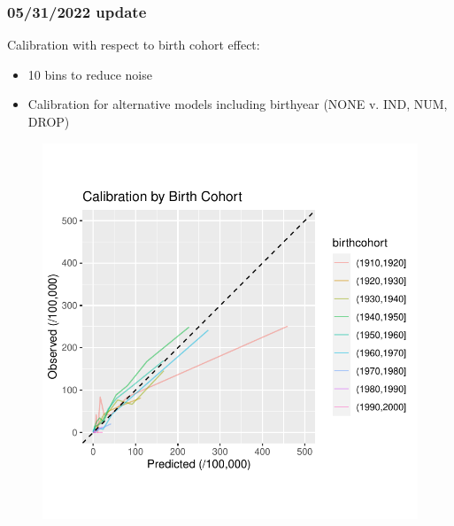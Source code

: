\documentclass[12pt]{article}
\begin{document}
\clearpage
\pagebreak
\subsubsection*{05/31/2022 update}

Calibration with respect to birth cohort effect:
\begin{itemize}
	\item 10 bins to reduce noise
	\item Calibration for alternative models including birthyear (NONE v. IND, NUM, DROP)
\end{itemize}



\begin{figure}[h]
\centering
\includegraphics[width=1.0\textwidth]{figures/birthyear/calibration_birthcohort_zoom.pdf}
\end{figure}
\end{document}
